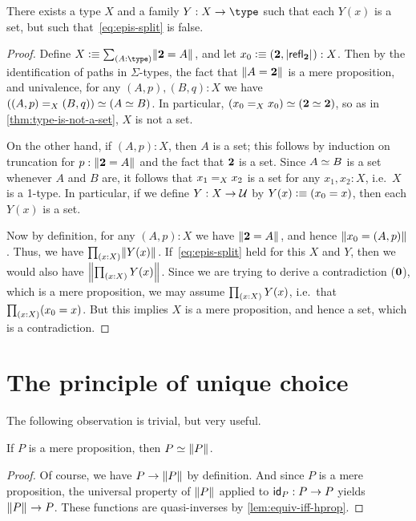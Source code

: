 \begin{lem}\label{thm:no-higher-ac}
  There exists a type $X$ and a family $Y:X\to \type$ such that each $Y(x)$ is a set, but such that~\eqref{eq:epis-split} is false.
\end{lem}
\begin{proof}
  Define $X\defeq \sm{A:\type} \brck{\bool = A}$, and let $x_0 \defeq (\bool, \bproj{\refl{\bool}}) : X$.
  Then by the identification of paths in $\Sigma$-types, the fact that $\brck{A=\bool}$ is a mere proposition, and univalence, for any $(A,p),(B,q):X$ we have $\eqv{(\id[X]{(A,p)}{(B,q)})}{(\eqv AB)}$.
  In particular, $\eqv{(\id[X]{x_0}{x_0})}{(\eqv \bool\bool)}$, so as in \autoref{thm:type-is-not-a-set}, $X$ is not a set.

  On the other hand, if $(A,p):X$, then $A$ is a set; this follows by induction on truncation for $p:\brck{\bool=A}$ and the fact that $\bool$ is a set.
  Since $\eqv A B$ is a set whenever $A$ and $B$ are, it follows that $\id[X]{x_1}{x_2}$ is a set for any $x_1,x_2:X$, i.e.\ $X$ is a 1-type.
  In particular, if we define $Y:X\to\UU$ by $Y(x) \defeq (x_0=x)$, then each $Y(x)$ is a set.

  Now by definition, for any $(A,p):X$ we have $\brck{\bool=A}$, and hence $\brck{x_0 = (A,p)}$.
  Thus, we have $\prd{x:X} \brck{Y(x)}$.
  If~\eqref{eq:epis-split} held for this $X$ and $Y$, then we would also have $\brck{\prd{x:X} Y(x)}$.
  Since we are trying to derive a contradiction ($\emptyt$), which is a mere proposition, we may assume $\prd{x:X} Y(x)$, i.e.\ that $\prd{x:X} (x_0=x)$.
  But this implies $X$ is a mere proposition, and hence a set, which is a contradiction.
\end{proof}

%
%

\section{The principle of unique choice}
\label{sec:unique-choice}

%
%

The following observation is trivial, but very useful.

\begin{lem}
  If $P$ is a mere proposition, then $\eqv P {\brck P}$.
\end{lem}
\begin{proof}
  Of course, we have $P\to \brck{P}$ by definition.
  And since $P$ is a mere proposition, the universal property of $\brck P$ applied to $\idfunc[P] :P\to P$ yields $\brck P \to P$.
  These functions are quasi-inverses by \autoref{lem:equiv-iff-hprop}.
\end{proof}

